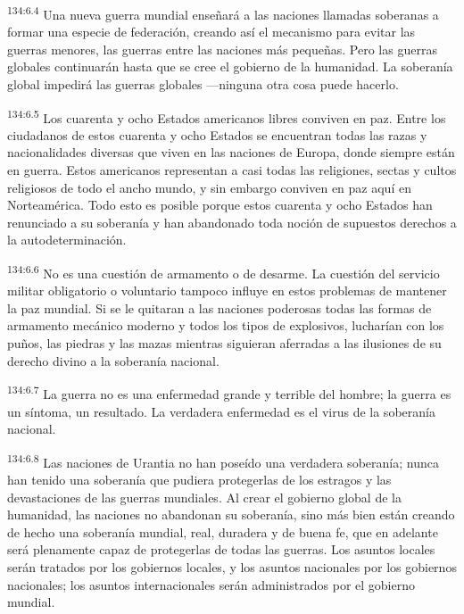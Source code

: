 \par 
\textsuperscript{134:6.4} Una nueva guerra mundial enseñará a las naciones llamadas soberanas a formar una especie de federación, creando así el mecanismo para evitar las guerras menores, las guerras entre las naciones más pequeñas. Pero las guerras globales continuarán hasta que se cree el gobierno de la humanidad. La soberanía global impedirá las guerras globales ---ninguna otra cosa puede hacerlo.

\par 
\textsuperscript{134:6.5} Los cuarenta y ocho Estados americanos libres conviven en paz. Entre los ciudadanos de estos cuarenta y ocho Estados se encuentran todas las razas y nacionalidades diversas que viven en las naciones de Europa, donde siempre están en guerra. Estos americanos representan a casi todas las religiones, sectas y cultos religiosos de todo el ancho mundo, y sin embargo conviven en paz aquí en Norteamérica. Todo esto es posible porque estos cuarenta y ocho Estados han renunciado a su soberanía y han abandonado toda noción de supuestos derechos a la autodeterminación.

\par 
\textsuperscript{134:6.6} No es una cuestión de armamento o de desarme. La cuestión del servicio militar obligatorio o voluntario tampoco influye en estos problemas de mantener la paz mundial. Si se le quitaran a las naciones poderosas todas las formas de armamento mecánico moderno y todos los tipos de explosivos, lucharían con los puños, las piedras y las mazas mientras siguieran aferradas a las ilusiones de su derecho divino a la soberanía nacional.

\par 
\textsuperscript{134:6.7} La guerra no es una enfermedad grande y terrible del hombre; la guerra es un síntoma, un resultado. La verdadera enfermedad es el virus de la soberanía nacional.

\par 
\textsuperscript{134:6.8} Las naciones de Urantia no han poseído una verdadera soberanía; nunca han tenido una soberanía que pudiera protegerlas de los estragos y las devastaciones de las guerras mundiales. Al crear el gobierno global de la humanidad, las naciones no abandonan su soberanía, sino más bien están creando de hecho una soberanía mundial, real, duradera y de buena fe, que en adelante será plenamente capaz de protegerlas de todas las guerras. Los asuntos locales serán tratados por los gobiernos locales, y los asuntos nacionales por los gobiernos nacionales; los asuntos internacionales serán administrados por el gobierno mundial.

